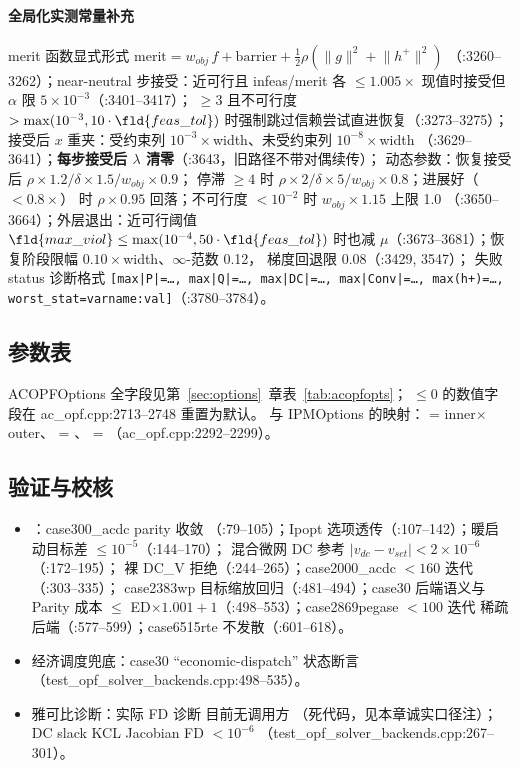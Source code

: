 \paragraph{全局化实测常量补充}
merit 函数显式形式 $\mathrm{merit}=w_{obj}\,f+\mathrm{barrier}+\tfrac12\rho(\lVert g\rVert^2+\lVert h^+\rVert^2)$
（:3260--3262）；near-neutral 步接受：近可行且 infeas/merit 各 $\le1.005\times$
现值时接受但 $\alpha$ 限 $5\times10^{-3}$（:3401--3417）；
$\ge3$ 且不可行度 $>\max(10^{-3},10\cdot\fld{feas\_tol})$
时强制跳过信赖尝试直进恢复（:3273--3275）；
接受后 $x$ 重夹：受约束列 $10^{-3}\times$width、未受约束列 $10^{-8}\times$width
（:3629--3641）；\textbf{每步接受后 $\lambda$ 清零}（:3643，旧路径不带对偶续传）；
动态参数：恢复接受后 $\rho\times1.2/\delta\times1.5/w_{obj}\times0.9$；
停滞 $\ge4$ 时 $\rho\times2/\delta\times5/w_{obj}\times0.8$；进展好（$<0.8\times$）
时 $\rho\times0.95$ 回落；不可行度 $<10^{-2}$ 时 $w_{obj}\times1.15$ 上限 1.0
（:3650--3664）；外层退出：近可行阈值 $\fld{max\_viol}\le\max(10^{-4},50\cdot\fld{feas\_tol})$
时也减 $\mu$（:3673--3681）；恢复阶段限幅 $0.10\times$width、$\infty$-范数 0.12，
梯度回退限 0.08（:3429, 3547）；
失败 status 诊断格式 \texttt{[max|P|=…, max|Q|=…, max|DC|=…, max|Conv|=…, max(h+)=…,
worst\_stat=varname:val]}（:3780--3784）。

\subsection{参数表}
ACOPFOptions 全字段见第~\ref{sec:options}~章表~\ref{tab:acopfopts}；
$\le0$ 的数值字段在 ac\_opf.cpp:2713--2748 重置为默认。
与 IPMOptions 的映射： = inner$\times$outer、
 = 、
 = （ac\_opf.cpp:2292--2299）。

\subsection{验证与校核}
\begin{itemize}
  \item {}：case300\_acdc parity 收敛
        （:79--105）；Ipopt 选项透传（:107--142）；暖启动目标差 $\le10^{-5}$（:144--170）；
        混合微网 DC 参考 $|v_{dc}-v_{set}|<2\times10^{-6}$（:172--195）；
        裸 DC\_V 拒绝（:244--265）；case2000\_acdc $<160$ 迭代（:303--335）；
        case2383wp 目标缩放回归（:481--494）；case30 后端语义与
        Parity 成本 $\le$ ED$\times1.001+1$（:498--553）；case2869pegase $<100$ 迭代
        稀疏后端（:577--599）；case6515rte 不发散（:601--618）。
  \item 经济调度兜底：case30 ``economic-dispatch'' 状态断言（test\_opf\_solver\_backends.cpp:498--535）。
  \item 雅可比诊断：实际 FD 诊断  目前无调用方
        （死代码，见本章诚实口径注）；DC slack KCL Jacobian FD $<10^{-6}$
        （test\_opf\_solver\_backends.cpp:267--301）。
\end{itemize}
